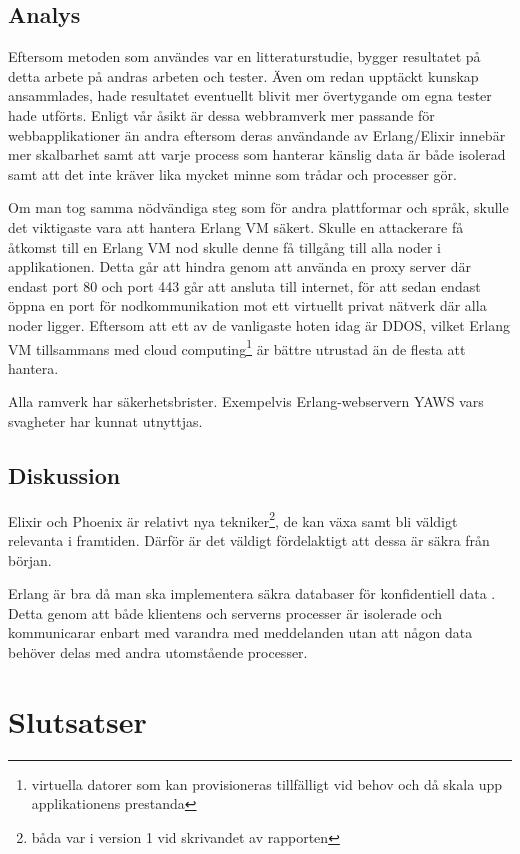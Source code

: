 \documentclass[12pt]{article}
\begin{document}
\subsection{Analys}
Eftersom metoden som användes var en litteraturstudie, bygger resultatet på detta arbete på andras arbeten och tester. Även om redan upptäckt kunskap ansammlades, hade resultatet eventuellt blivit mer övertygande om egna tester  hade utförts.
Enligt vår åsikt är dessa webbramverk mer passande för webbapplikationer än andra eftersom deras användande av Erlang/Elixir innebär mer skalbarhet samt att varje process som hanterar känslig data är både isolerad samt att det inte kräver lika mycket minne som trådar och processer gör.

Om man tog samma nödvändiga steg som för andra plattformar och språk, skulle det viktigaste vara att hantera Erlang VM säkert. Skulle en attackerare få åtkomst till en Erlang VM nod skulle denne få tillgång till alla noder i applikationen.
Detta går att hindra genom att använda en proxy \cite{101} server där endast port 80 och port 443 går att ansluta till internet, för att sedan endast öppna en port för nodkommunikation mot ett virtuellt privat nätverk där alla noder ligger.
 Eftersom att ett av de vanligaste hoten idag är DDOS, vilket Erlang VM tillsammans med cloud computing\footnote{virtuella datorer som kan provisioneras tillfälligt vid behov och då skala upp applikationens prestanda} är bättre utrustad än de flesta att hantera.

Alla ramverk har säkerhetsbrister. Exempelvis Erlang-webservern YAWS vars svagheter har kunnat utnyttjas\cite{exploit}. 
	\subsection{Diskussion}

Elixir och Phoenix är relativt nya tekniker\footnote{båda var i version 1 vid skrivandet av rapporten}, de kan växa samt bli väldigt relevanta i framtiden\cite{phoenix/ruby}. Därför är det väldigt fördelaktigt att dessa är säkra från början.

Erlang är bra då man ska implementera säkra databaser för konfidentiell data
 \cite{database}. Detta genom att både klientens och serverns processer är isolerade och kommunicarar enbart med varandra med meddelanden utan att någon data behöver delas med andra utomstående processer.
    
    
\section{Slutsatser}
\end{document}
